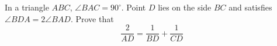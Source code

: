 In a triangle $ABC$,  $\angle BAC =90^{\circ}$. Point $D$ lies on the side $BC$ and satisfies $\angle BDA=2\angle BAD$. Prove that\[\frac{2}{AD}=\frac{1}{BD}+\frac{1}{CD} \]